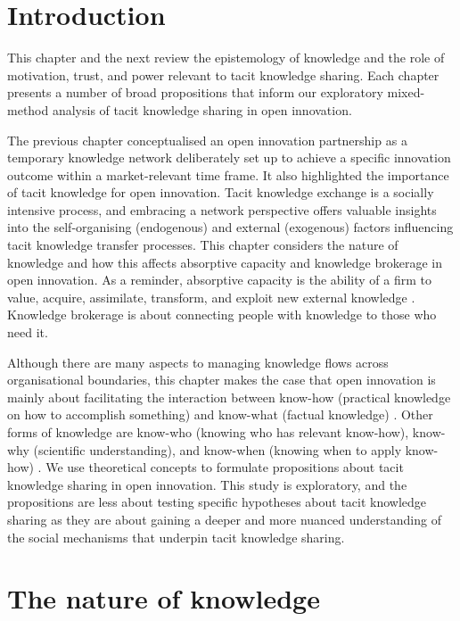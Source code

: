 
\section{Introduction}

This chapter and the next review the epistemology of knowledge and the role of motivation, trust, and power relevant to tacit knowledge sharing. Each chapter presents a number of broad propositions that inform our exploratory mixed-method analysis of tacit knowledge sharing in open innovation. \medskip

The previous chapter conceptualised an open innovation partnership as a temporary knowledge network deliberately set up to achieve a specific innovation outcome within a market-relevant time frame. It also highlighted the importance of tacit knowledge for open innovation. Tacit knowledge exchange is a socially intensive process, and embracing a network perspective offers valuable insights into the self-organising (endogenous) and external (exogenous) factors influencing tacit knowledge transfer processes. This chapter considers the nature of knowledge and how this affects absorptive capacity and knowledge brokerage in open innovation. As a reminder, absorptive capacity is the ability of a firm to value, acquire, assimilate, transform, and exploit new external knowledge \citep{cohen1990absorptive}. Knowledge brokerage is about connecting people with knowledge to those who need it. \medskip

Although there are many aspects to managing knowledge flows across organisational boundaries, this chapter makes the case that open innovation is mainly about facilitating the interaction between know-how (practical knowledge on how to accomplish something) and know-what (factual knowledge) \citep{winter1987knowledge,garud1997distinction}. Other forms of knowledge are know-who (knowing who has relevant know-how), know-why (scientific understanding), and know-when (knowing when to apply know-how) \citep{hulme2014editorial}. We use theoretical concepts to formulate propositions about tacit knowledge sharing in open innovation. This study is exploratory, and the propositions are less about testing specific hypotheses about tacit knowledge sharing as they are about gaining a deeper and more nuanced understanding of the social mechanisms that underpin tacit knowledge sharing. 

\section{The nature of knowledge}

